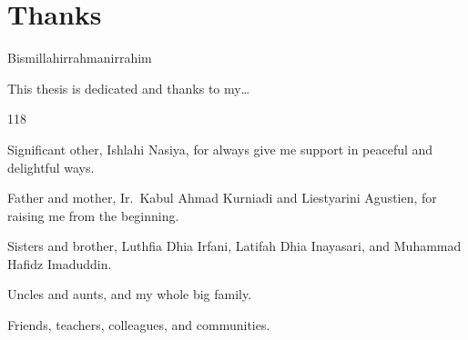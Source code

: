 
\begingroup
\let\clearpage\relax
\let\cleardoublepage\relax

\chapter{Thanks}
\label{chap:thanks}

Bismillahirrahmanirrahim

\noindent This thesis is dedicated and thanks to my\ldots

\hfill

\begin{dinglist}{118}
\item Significant other, Ishlahi Nasiya, for always give me support in peaceful and delightful ways.
\item Father and mother, Ir.\ Kabul Ahmad Kurniadi and Liestyarini Agustien, for raising me from the beginning.
\item Sisters and brother, Luthfia Dhia Irfani, Latifah Dhia Inayasari, and Muhammad Hafidz Imaduddin.
\item Uncles and aunts, and my whole big family.
\item Friends, teachers, colleagues, and communities.
\end{dinglist}

\endgroup
